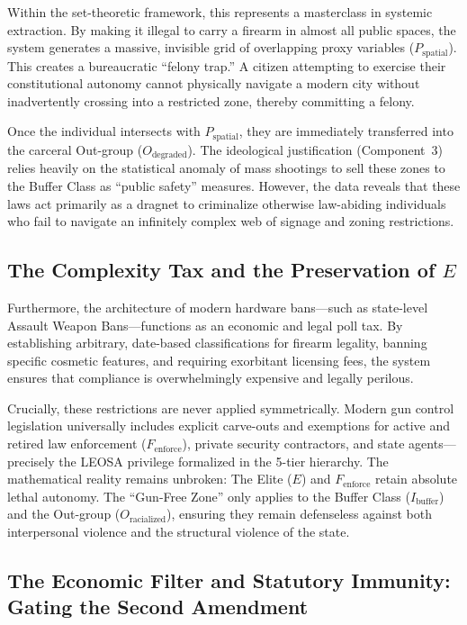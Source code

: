 \documentclass[12pt,openany]{book}
\begin{document}
Within the set-theoretic framework, this represents a masterclass in systemic extraction. By making it illegal to carry a firearm in almost all public spaces, the system generates a massive, invisible grid of overlapping proxy variables ($P_{\text{spatial}}$). This creates a bureaucratic ``felony trap.'' A citizen attempting to exercise their constitutional autonomy cannot physically navigate a modern city without inadvertently crossing into a restricted zone, thereby committing a felony.

Once the individual intersects with $P_{\text{spatial}}$, they are immediately transferred into the carceral Out-group ($O_{\text{degraded}}$). The ideological justification (Component~3) relies heavily on the statistical anomaly of mass shootings to sell these zones to the Buffer Class as ``public safety'' measures. However, the data reveals that these laws act primarily as a dragnet to criminalize otherwise law-abiding individuals who fail to navigate an infinitely complex web of signage and zoning restrictions.

\subsection{The Complexity Tax and the Preservation of \texorpdfstring{$E$}{E}}
Furthermore, the architecture of modern hardware bans---such as state-level Assault Weapon Bans---functions as an economic and legal poll tax. By establishing arbitrary, date-based classifications for firearm legality, banning specific cosmetic features, and requiring exorbitant licensing fees, the system ensures that compliance is overwhelmingly expensive and legally perilous.

Crucially, these restrictions are never applied symmetrically. Modern gun control legislation universally includes explicit carve-outs and exemptions for active and retired law enforcement ($F_{\text{enforce}}$), private security contractors, and state agents---precisely the LEOSA privilege formalized in the 5-tier hierarchy. The mathematical reality remains unbroken: The Elite ($E$) and $F_{\text{enforce}}$ retain absolute lethal autonomy. The ``Gun-Free Zone'' only applies to the Buffer Class ($I_{\text{buffer}}$) and the Out-group ($O_{\text{racialized}}$), ensuring they remain defenseless against both interpersonal violence and the structural violence of the state.

\subsection{The Economic Filter and Statutory Immunity: Gating the Second Amendment}
\end{document}

